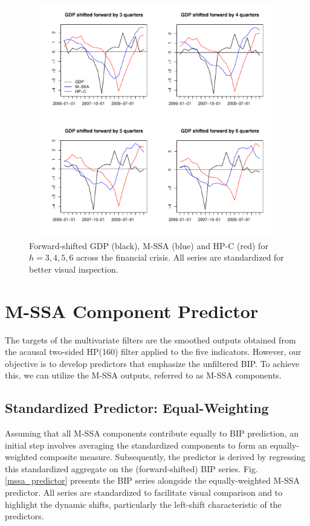 \documentclass[a4paper]{article}
\begin{document}
\begin{figure}[H]\begin{center}\includegraphics[height=4in, width=5.5in]{./Figures/mssa_hpc_financial_crisis.pdf}\caption{Forward-shifted GDP (black), M-SSA (blue) and HP-C (red) for $h=3,4,5,6$ across the financial crisis. All series are standardized for better visual inspection.\label{mssa_hpc_financial_crisis}}\end{center}\end{figure}

\section{M-SSA Component Predictor}

The targets of the multivariate filters are the smoothed outputs obtained from the acausal two-sided HP(160) filter applied to the five indicators. However, our objective is to develop predictors that emphasize the unfiltered BIP. To achieve this, we can utilize the  M-SSA outputs, referred to as M-SSA components.




\subsection{Standardized Predictor: Equal-Weighting}


Assuming that all M-SSA components contribute equally to BIP prediction, an initial step involves averaging the standardized components to form an equally-weighted composite measure. Subsequently, the predictor is derived by regressing this standardized aggregate on the (forward-shifted) BIP series. Fig. \eqref{mssa_predictor} presents the BIP series alongside the equally-weighted M-SSA predictor. All series are standardized to facilitate visual comparison and to highlight the dynamic shifts, particularly the left-shift characteristic of the predictors.\\
\end{document}
